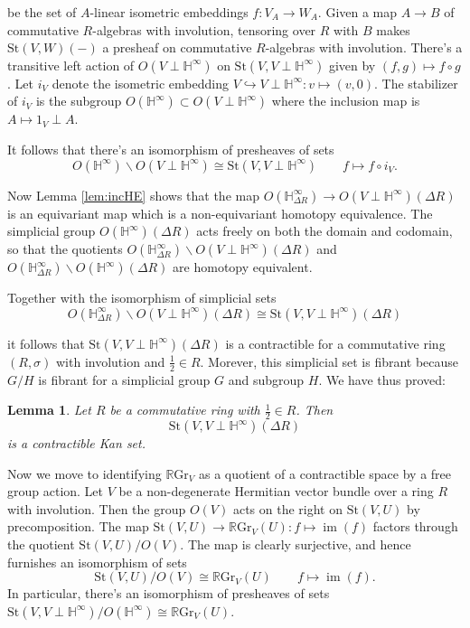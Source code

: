 \documentclass[edeposit,fullpage]{uiucthesis2009}
\newcommand{\mbb}{\mathbb}
\newcommand{\RGr}{\mathbb R\mathrm{Gr}}
\newcommand{\St}{\mathrm{St}}
\DeclareMathOperator*{\im}{im}
\theoremstyle{plain}
\newtheorem{lemma}{Lemma}
\numberwithin{lemma}{section}
\theoremstyle{definition}
\begin{document}
be the set of $A$-linear isometric embeddings $f : V_A \rightarrow
W_A$. Given a map $A \rightarrow B$ of commutative $R$-algebras with involution, tensoring over $R$ with $B$ makes
$\St(V,W)(-)$ a presheaf on commutative $R$-algebras with involution. There's a
transitive left action of $O(V \perp \mbb H^\infty)$ on $\St(V,V \perp \mbb
H^\infty)$ given by $(f,g) \mapsto f \circ g$. Let $i_V$ denote the
isometric embedding $V \hookrightarrow V \perp \mbb H^\infty : v
\mapsto (v,0)$. The stabilizer of $i_V$ is the subgroup $O(\mbb
H^\infty) \subset O(V \perp \mbb H^\infty)$ where the inclusion map is
$A \mapsto 1_V \perp A$.

It follows that there's an isomorphism of presheaves of sets 
\[
O(\mbb H^\infty)\backslash O(V \perp \mbb  H^\infty) \cong
\St(V,V\perp \mbb H^\infty) \qquad f \mapsto f \circ i_V.
\]

Now Lemma \ref{lem:incHE} shows that the map $O(\mbb H^\infty_{\Delta
  R}) \rightarrow O(V \perp \mbb H^\infty)(\Delta R)$ is an
equivariant map which is a non-equivariant homotopy equivalence. The
simplicial group $O(\mbb H^\infty)(\Delta R)$ acts freely on both the
domain and codomain, so that the quotients $O(\mbb H^\infty_{\Delta
  R})\backslash O(V \perp \mbb H^\infty)(\Delta R)$ and $O(\mbb H^\infty_{\Delta
  R})\backslash O(\mbb H^\infty)(\Delta R)$ are homotopy equivalent.

Together with the isomorphism of simplicial sets
\[
O(\mbb H^\infty_{\Delta
  R})\backslash O(V \perp \mbb H^\infty)(\Delta R) \cong \St(V,V
\perp \mbb H^\infty)(\Delta R)
\]

it follows that $\St(V,V\perp \mbb H^\infty)(\Delta R)$ is a
contractible for a commutative ring $(R,\sigma)$ with involution and
$\frac{1}{2} \in R$. Morever, this simplicial set is fibrant because
$G/H$ is fibrant for a simplicial group $G$ and subgroup $H$. We have
thus proved:

\begin{lemma}\label{lem:St_contrac}
Let $R$ be a commutative ring with $\frac{1}{2} \in R$. Then 
\[
\St(V,V\perp \mbb H^\infty)(\Delta R)
\]
is a contractible Kan set.
\end{lemma}

Now we move to identifying $\RGr_V$ as a quotient of a contractible
space by a free group action. Let $V$ be a non-degenerate Hermitian
vector bundle over a ring $R$ with involution. Then the group $O(V)$
acts on the right on $\St(V,U)$ by precomposition. The map $\St(V,U)
\rightarrow \RGr_V(U) : f \mapsto \im(f)$ factors through the quotient
$\St(V,U)/O(V)$. The map is clearly surjective, and hence furnishes an
isomorphism of sets
\[
\St(V,U)/O(V) \cong \RGr_V(U) \qquad f \mapsto \im(f).
\]
In particular, there's an isomorphism of presheaves of sets $\St(V,V \perp \mbb
H^\infty)/O(\mbb H^\infty) \cong \RGr_V(U)$.
\end{document}

